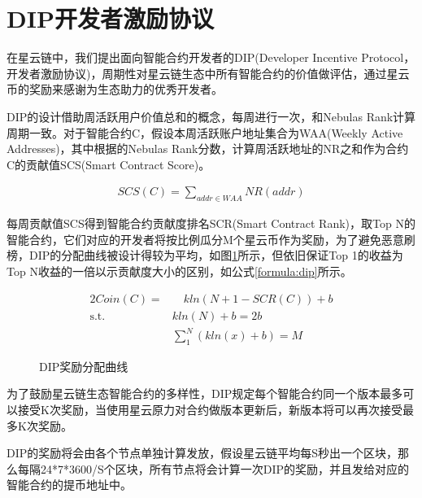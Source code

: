 \section{DIP开发者激励协议}
\label{sec:dip}

在星云链中，我们提出面向智能合约开发者的DIP(Developer Incentive Protocol，开发者激励协议)，周期性对星云链生态中所有智能合约的价值做评估，通过星云币的奖励来感谢为生态助力的优秀开发者。

DIP的设计借助周活跃用户价值总和的概念，每周进行一次，和Nebulas Rank计算周期一致。对于智能合约C，假设本周活跃账户地址集合为WAA(Weekly Active Addresses)，其中根据的Nebulas Rank分数，计算周活跃地址的NR之和作为合约C的贡献值SCS(Smart Contract Score)。

\begin{align}
SCS(C)=\sum_{addr \in WAA}NR(addr)
\end{align}

每周贡献值SCS得到智能合约贡献度排名SCR(Smart Contract Rank)，取Top N的智能合约，它们对应的开发者将按比例瓜分M个星云币作为奖励，为了避免恶意刷榜，DIP的分配曲线被设计得较为平均，如图\ref{fig:dip}所示，但依旧保证Top 1的收益为Top N收益的一倍以示贡献度大小的区别，如公式\ref{formula:dip}所示。

\begin{alignat}{2}
Coin(C) = & \quad kln(N+1-SCR(C))+b \label{formula:dip} \\
\mbox{s.t.}\quad & kln(N) + b = 2b \nonumber \\
& \sum_{1}^{N}(kln(x) + b) = M \nonumber
\end{alignat}

\begin{figure}[h] 
\centering
{}
\label{fig:dip}
\caption{DIP奖励分配曲线}
\end{figure}

为了鼓励星云链生态智能合约的多样性，DIP规定每个智能合约同一个版本最多可以接受K次奖励，当使用星云原力对合约做版本更新后，新版本将可以再次接受最多K次奖励。

DIP的奖励将会由各个节点单独计算发放，假设星云链平均每S秒出一个区块，那么每隔24*7*3600/S个区块，所有节点将会计算一次DIP的奖励，并且发给对应的智能合约的提币地址中。
